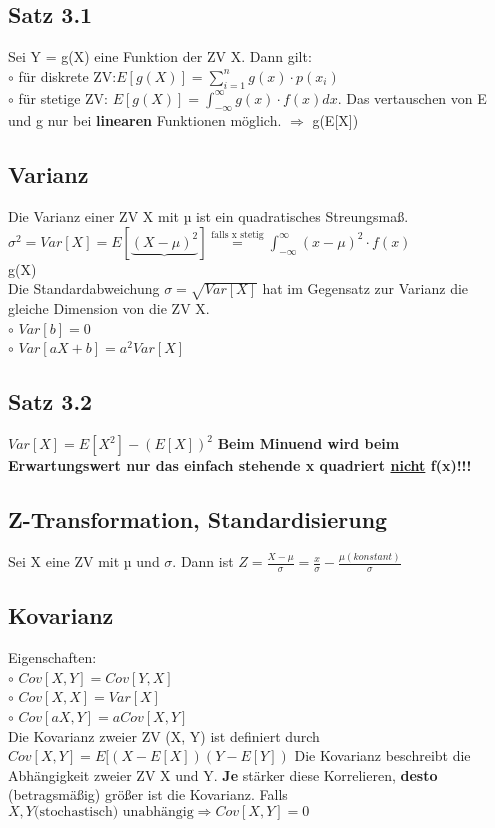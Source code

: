 \subsection{Satz 3.1}
Sei Y = g(X) eine Funktion der ZV X. Dann gilt:\\
  $\circ$ für diskrete ZV:$E[g(X)] = \sum_{i=1}^{n} g(x) \cdot p(x_ {i})$\\
  $\circ$ für stetige ZV: $E[g(X)] = \int_{- \infty}^{\infty} g(x) \cdot f(x) dx$. Das vertauschen von E und g nur bei \textbf{linearen} Funktionen möglich. $\Rightarrow$ g(E[X])
\subsection{Varianz}
Die Varianz einer ZV X mit µ ist ein quadratisches Streungsmaß. $\sigma^2 = Var[X] = E[\underbrace{(X - \mu )^2}] \stackrel{\text{falls x stetig}}{=} \int_{-\infty}^{\infty} (x-\mu)^2 \cdot f(x)$\\
g(X)\\
Die Standardabweichung $\sigma = \sqrt{Var[X]}$ hat im Gegensatz zur Varianz die gleiche Dimension von die ZV X.\\
  $\circ$ $Var[b] = 0$\\
  $\circ$ $Var[aX + b] = a^2 Var[X]$
\subsection{Satz 3.2}
$Var[X] = E[X^2] - (E[X])^2$ \textbf{Beim Minuend wird beim Erwartungswert nur das einfach stehende x quadriert \underline{nicht} f(x)!!!}
\subsection{Z-Transformation, Standardisierung}
Sei X eine ZV mit µ und $\sigma$. Dann ist $Z = \frac{X - \mu}{\sigma} = \frac{x}{\sigma} - \frac{\mu (konstant)}{\sigma}$ 
\subsection{Kovarianz}
Eigenschaften:\\
  $\circ$ $Cov[X, Y] = Cov[Y,X]$\\
  $\circ$ $Cov[X, X] = Var[X]$\\
  $\circ$ $Cov[aX, Y] = a Cov[X,Y]$\\
Die Kovarianz zweier ZV (X, Y) ist definiert durch
$Cov[X, Y] = E[(X - E[X])(Y-E[Y])$
Die Kovarianz beschreibt die Abhängigkeit zweier ZV X und Y. \textbf{Je} stärker diese Korrelieren, \textbf{desto} (betragsmäßig) größer ist die Kovarianz. Falls $X, Y \text{(stochastisch) unabhängig} \Rightarrow Cov[X, Y] = 0$ 
